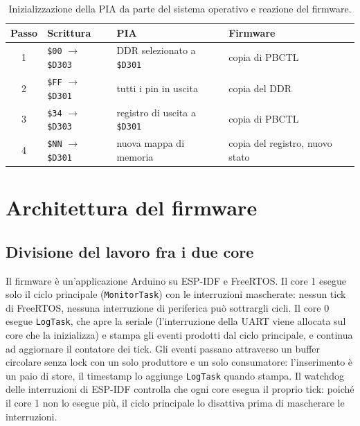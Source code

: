 \documentclass[11pt,a4paper,twoside,openright]{report}
\DeclareRobustCommand{\code}[1]{\begingroup\renewcommand{\_}{\textunderscore\allowbreak}\texttt{#1}\endgroup}
\newcommand{\hex}[1]{\texttt{\$#1}}
\begin{document}
\begin{table}[htbp]
  \centering
  \caption{Inizializzazione della PIA da parte del sistema operativo e reazione del firmware.}
  \label{tab:osinit}
  \begin{tabular}{clll}
    \toprule
    \textbf{Passo} & \textbf{Scrittura} & \textbf{PIA} & \textbf{Firmware} \\
    \midrule
    1 & \hex{00} $\to$ \hex{D303} & DDR selezionato a \hex{D301} & copia di PBCTL \\
    2 & \hex{FF} $\to$ \hex{D301} & tutti i pin in uscita           & copia del DDR \\
    3 & \hex{34} $\to$ \hex{D303} & registro di uscita a \hex{D301} & copia di PBCTL \\
    4 & \hex{NN} $\to$ \hex{D301} & nuova mappa di memoria          & copia del registro, nuovo stato \\
    \bottomrule
  \end{tabular}
\end{table}

\chapter{Architettura del firmware}
\label{cap:fw}

\section{Divisione del lavoro fra i due core}

Il firmware è un'applicazione Arduino su ESP-IDF e FreeRTOS. Il core 1 esegue solo il
ciclo principale (\code{MonitorTask}) con le interruzioni mascherate: nessun tick di
FreeRTOS, nessuna interruzione di periferica può sottrargli cicli. Il core 0 esegue
\code{LogTask}, che apre la seriale (l'interruzione della UART viene allocata sul core che la
inizializza) e stampa gli eventi prodotti dal ciclo principale, e continua ad aggiornare il
contatore dei tick. Gli eventi passano attraverso un buffer circolare senza lock con un solo
produttore e un solo consumatore: l'inserimento è un paio di store, il timestamp lo aggiunge
\code{LogTask} quando stampa. Il watchdog delle interruzioni di ESP-IDF controlla che ogni
core esegua il proprio tick: poiché il core 1 non lo esegue più, il ciclo principale lo
disattiva prima di mascherare le interruzioni.
\end{document}
